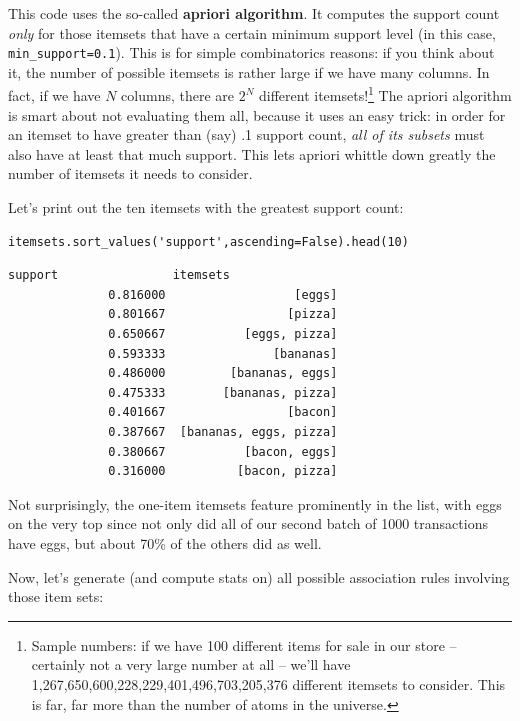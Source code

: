 This code uses the so-called \textbf{apriori algorithm}. It computes the
support count \textit{only} for those itemsets that have a certain minimum
support level (in this case, \texttt{min\_support=0.1}). This is for simple
combinatorics reasons: if you think about it, the number of possible itemsets
is rather large if we have many columns. In fact, if we have $N$ columns, there
are $2^N$ different itemsets!\footnote{Sample numbers: if we have 100 different
items for sale in our store -- certainly not a very large number at all --
we'll have 1,267,650,600,228,229,401,496,703,205,376 different itemsets to
consider. This is far, far more than the number of atoms in the universe.} The
apriori algorithm is smart about not evaluating them all, because it uses an
easy trick: in order for an itemset to have greater than (say) .1 support
count, \textit{all of its subsets} must also have at least that much support.
This lets apriori whittle down greatly the number of itemsets it needs to
consider.

\bigskip
Let's print out the ten itemsets with the greatest support count:
\begin{Verbatim}[fontsize=\small,samepage=true,frame=single,framesep=3mm]
itemsets.sort_values('support',ascending=False).head(10)
\end{Verbatim}
\vspace{-.2in}

\begin{Verbatim}[fontsize=\small,samepage=true,frame=leftline,framesep=5mm,framerule=1mm]
               support                itemsets
              0.816000                  [eggs]
              0.801667                 [pizza]
              0.650667           [eggs, pizza]
              0.593333               [bananas]
              0.486000         [bananas, eggs]
              0.475333        [bananas, pizza]
              0.401667                 [bacon]
              0.387667  [bananas, eggs, pizza]
              0.380667           [bacon, eggs]
              0.316000          [bacon, pizza]
\end{Verbatim}

Not surprisingly, the one-item itemsets feature prominently in the list, with
eggs on the very top since not only did all of our second batch of 1000
transactions have eggs, but about 70\% of the others did as well.

\medskip

Now, let's generate (and compute stats on) all possible association rules
involving those item sets:

